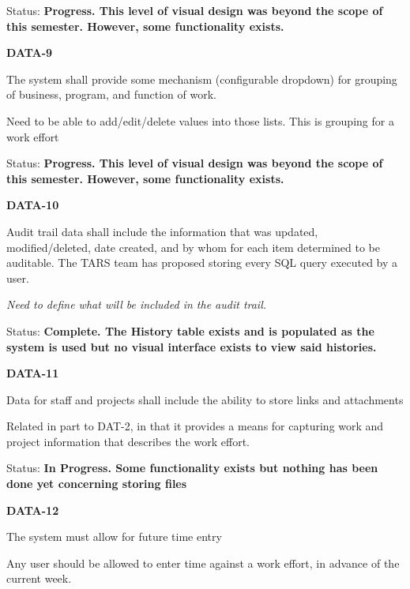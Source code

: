 \documentclass{article}
\begin{document}
\noindent Status: \textbf{Progress.  This level of visual design was beyond the scope of this semester.  However, some functionality exists.}

\noindent 

\noindent \textbf{DATA-9}

\noindent The system shall provide some mechanism (configurable dropdown) for grouping of business, program, and function of work.

Need to be able to add/edit/delete values into those lists. This is grouping for a work effort

\noindent Status: \textbf{Progress.  This level of visual design was beyond the scope of this semester.  However, some functionality exists.}

\noindent 

\noindent \textbf{DATA-10}

\noindent Audit trail data shall include the information that was updated, modified/deleted, date created, and by whom for each item determined to be auditable. The TARS team has proposed storing every SQL query executed by a user.

 \textit{Need to define what will be included in the audit trail.}

\noindent Status: \textbf{Complete.  The History table exists and is populated as the system is used but no visual interface exists to view said histories.}\textit{}

\noindent 

\noindent \textbf{DATA-11}

\noindent Data for staff and projects shall include the ability to store links and attachments

\noindent Related in part to DAT-2, in that it provides a means for capturing work and project information that describes the work effort.

\noindent Status: \textbf{In Progress.  Some functionality exists but nothing has been done yet concerning storing files} 

\noindent 

\noindent \textbf{}

\noindent \textbf{}

\noindent \textbf{}

\noindent \textbf{}

\noindent \textbf{DATA-12}

\noindent The system must allow for future time entry

Any user should be allowed to enter time against a work effort, in advance of the current week.
\end{document}
